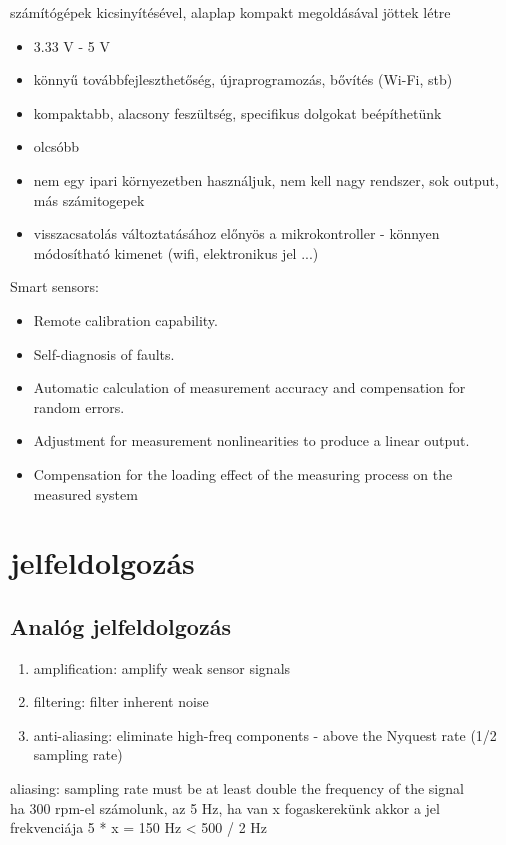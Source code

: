 \documentclass{article}
\begin{document}
	számítógépek kicsinyítésével, alaplap kompakt megoldásával jöttek létre
	
	\begin{itemize}
		\item 3.33 V - 5 V
		\item könnyű továbbfejleszthetőség, újraprogramozás, bővítés (Wi-Fi, stb)
		\item kompaktabb, alacsony feszültség, specifikus dolgokat beépíthetünk
		\item olcsóbb
		\item nem egy ipari környezetben használjuk, nem kell nagy rendszer, sok output, más számitogepek
		\item visszacsatolás változtatásához előnyös a mikrokontroller - könnyen módosítható kimenet (wifi, elektronikus jel ...)
	\end{itemize}
	
	
	
	Smart sensors:
	\begin{itemize}
		\item Remote calibration capability.
		\item Self-diagnosis of faults.
		\item Automatic calculation of measurement accuracy and compensation for random errors.
		\item Adjustment for measurement nonlinearities to produce a linear output.
		\item Compensation for the loading effect of the measuring process on the measured system
	\end{itemize}
	
	
	\section{jelfeldolgozás}
	
	\subsection{Analóg jelfeldolgozás}
	\begin{enumerate}
		\item amplification: amplify weak sensor signals
		\item filtering: filter inherent noise
		\item anti-aliasing: eliminate high-freq components - above the Nyquest rate (1/2 sampling rate)
	\end{enumerate}
	aliasing: sampling rate must be at least double the frequency of the signal\\
	ha 300 rpm-el számolunk, az 5 Hz, ha van x fogaskerekünk akkor a jel frekvenciája 5 * x = 150 Hz < 500 / 2 Hz
\end{document}
